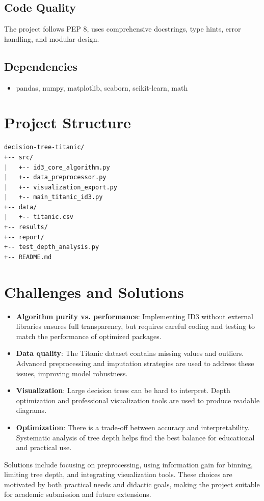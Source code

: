 \documentclass[conference]{IEEEtran}
\begin{document}
\subsection{Code Quality}
The project follows PEP 8, uses comprehensive docstrings, type hints, error handling, and modular design.
\subsection{Dependencies}
\begin{itemize}
    \item pandas, numpy, matplotlib, seaborn, scikit-learn, math
\end{itemize}

\section{Project Structure}
\begin{verbatim}
decision-tree-titanic/
+-- src/
|   +-- id3_core_algorithm.py
|   +-- data_preprocessor.py
|   +-- visualization_export.py
|   +-- main_titanic_id3.py
+-- data/
|   +-- titanic.csv
+-- results/
+-- report/
+-- test_depth_analysis.py
+-- README.md
\end{verbatim}

\section{Challenges and Solutions}
\begin{itemize}
    \item \textbf{Algorithm purity vs. performance}: Implementing ID3 without external libraries ensures full transparency, but requires careful coding and testing to match the performance of optimized packages.
    \item \textbf{Data quality}: The Titanic dataset contains missing values and outliers. Advanced preprocessing and imputation strategies are used to address these issues, improving model robustness.
    \item \textbf{Visualization}: Large decision trees can be hard to interpret. Depth optimization and professional visualization tools are used to produce readable diagrams.
    \item \textbf{Optimization}: There is a trade-off between accuracy and interpretability. Systematic analysis of tree depth helps find the best balance for educational and practical use.
\end{itemize}
Solutions include focusing on preprocessing, using information gain for binning, limiting tree depth, and integrating visualization tools. These choices are motivated by both practical needs and didactic goals, making the project suitable for academic submission and future extensions.
\end{document}
